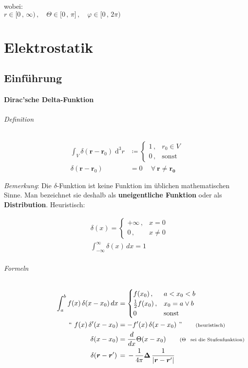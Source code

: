 \documentclass[titlepage,11pt,a4paper,ngerman]{report}
\renewcommand{\vec}[1]{\boldsymbol{#1}}
\renewcommand{\paragraph}[1]{\subsubsection{#1}}
\begin{document}
wobei:\\
$r\in \lbrack0\, ,\,\infty)\, ,\quad \Theta\in\lbrack 0\, ,\, \pi\rbrack\, , \quad \varphi\in\lbrack 0\, ,\, 2\pi) $

\chapter{Elektrostatik}

\section{Einführung}
\paragraph{Dirac'sche Delta-Funktion}
\subparagraph{Definition}

\begin{align*}
\int_{V} \delta(\vec{r}-\vec{r}_0) \; \text{d}^3r &\coloneqq
	\begin{cases} 
		1 \, , & r_0 \in V \\
		0 \, , & \text{sonst}
	\end{cases} \\
\delta(\vec{r}-\vec{r}_0) &= 0 \quad \ \forall \: \vec{r} \neq \vec{r_0}
\end{align*}

\emph{Bemerkung}: Die $\delta$-Funktion ist keine Funktion im üblichen mathematischen Sinne. Man bezeichnet sie deshalb als \textbf{uneigentliche Funktion} oder als \textbf{Distribution}. Heuristisch:

\begin{align*}
&\delta(x) = 
	\begin{cases}
		+ \infty \, , & x = 0 \\
		0 \, , & x \neq 0
	\end{cases} \\
&\int_{-\infty}^{\infty} \delta (x) \, dx = 1
\end{align*}

\subparagraph{Formeln}
\begin{align*}
\int_{a}^{b} f(x) \, \delta (x-x_0) \, dx &= 
	\begin{cases}
		f(x_0) \, , & a < x_0 < b \\
		\frac{1}{2} f(x_0) \, , & x_0 = a \lor b \\
		0 \, & \text{sonst}
	\end{cases} \\
`` \ f(x) \, \delta '(x-x_0) &= -f'(x) \, \delta (x-x_0) \ " \qquad \rlap{\text{\scriptsize{(heuristisch)}}} \\
\delta (x - x_0) &= \frac{d}{dx} \Theta (x - x_0) \qquad \rlap{\scriptsize{($ \Theta $ \, \text{sei die Stufenfunktion)}}}\\
\delta(\vec{r}-\vec{r}')\,&=\,-\,\frac{1}{4\pi}\vec{\Delta}\,\frac{1}{|\vec{r}-\vec{r}'|}
\end{align*} 
\end{document}
